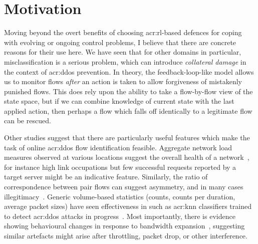 \section{Motivation}\label{sec:ddos-motivation}
Moving beyond the overt benefits of choosing \gls{acr:rl}-based defences for coping with evolving or ongoing control problems, I believe that there are concrete reasons for their use here.
We have seen that for other domains in particular, misclassification is a serious problem, which can introduce \emph{collateral damage} in the context of \gls{acr:ddos} prevention.
In theory, the feedback-loop-like model allows us to monitor flows \emph{after} an action is taken to allow forgiveness of mistakenly punished flows.
This does rely upon the ability to take a flow-by-flow view of the state space, but if we can combine knowledge of current state with the last applied action, then perhaps a flow which falls off identically to a legitimate flow can be rescued.

Other studies suggest that there are particularly useful features which make the task of online \gls{acr:ddos} flow identification feasible.
Aggregate network load measures observed at various locations suggest the overall health of a network~\parencite{DBLP:journals/eaai/MalialisK15}, for instance high link occupations but few successful requests reported by a target server might be an indicative feature.
Similarly, the ratio of correspondence between pair flows can suggest asymmetry, and in many cases illegitimacy~\parencite{DBLP:conf/ndss/Rossow14}.
Generic volume-based statistics (counts, counts per duration, average packet sizes) have seen effectiveness in such as \gls{acr:knn} classifiers trained to detect \gls{acr:ddos} attacks in progress~\parencite{DBLP:conf/dsn/LeeKSPY17}.
Most importantly, there is evidence showing behavioural changes in response to bandwidth expansion~\parencite{DBLP:conf/ndss/KangGS16}, suggesting similar artefacts might arise after throttling, packet drop, or other interference.

